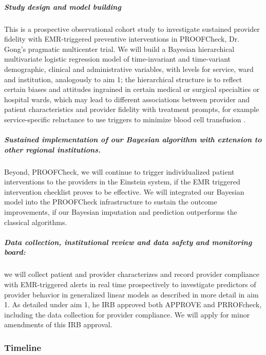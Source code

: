 \documentclass[11pt,notitlepage]{article}
\begin{document}
\subparagraph*{Study design and model building}
This is a prospective observational cohort study to investigate sustained provider fidelity with EMR-triggered preventive interventions in PROOFCheck, Dr. Gong's pragmatic multicenter trial. We will build a Bayesian hierarchical multivariate logistic regression model of time-invariant and time-variant demographic, clinical  and administrative variables, with levels for service, ward and institution, analogously to aim 1; the hierarchical structure is to reflect certain biases and attitudes ingrained in certain medical or surgical specialties or hospital wards, which may lead to different associations between provider and patient characteristics and provider fidelity with treatment prompts, for example service-specific reluctance to use triggers to minimize blood cell transfusion \cite{Goodnough_23706801}. 

\subparagraph*{Sustained implementation of our Bayesian algorithm with extension to other regional institutions.} Beyond, PROOFCheck, we will continue to trigger individualized patient interventions to the providers in the Einstein system, if the EMR triggered intervention checklist proves to be effective. We will integrated our Bayesian model into the PROOFCheck infrastructure to sustain the outcome improvements, if our Bayesian imputation and prediction outperforms the classical algorithms.

\subparagraph*{Data collection, institutional review and data safety and monitoring board:} we will collect patient and provider characterizes and record provider compliance with EMR-triggered alerts in real time prospectively to investigate predictors of provider behavior in generalized linear models as described in more detail in aim 1. As detailed under aim 1, he IRB approved both APPROVE and PRROFcheck, including the data collection for provider compliance. We will apply for minor amendments of this IRB approval.

\subsubsection*{Timeline}
\end{document}
